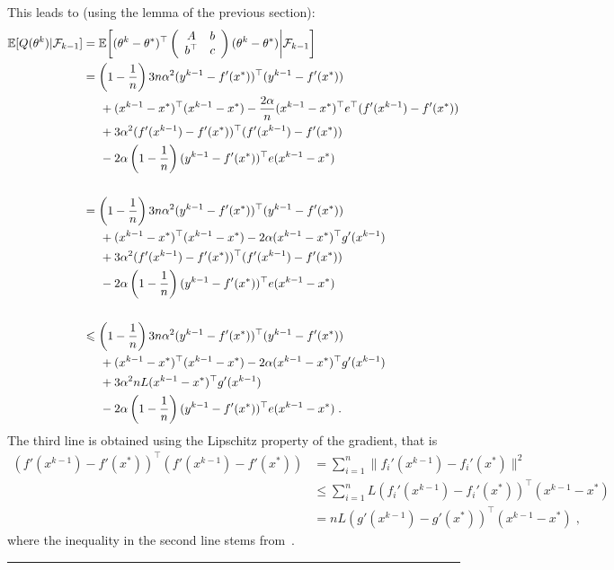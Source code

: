 \documentclass{article}
\newcommand{\BlackBox}{\rule{1.5ex}{1.5ex}}  %
\newenvironment{proof}{\par\noindent{\bf Proof\ }}{\hfill\BlackBox\\[2mm]}
\def\E{_{\scriptscriptstyle E}}
\def \E{{\mathbb E}}
\def \E{{\mathbb E}}
\begin{document}
\begin{proof}
This leads to (using the lemma of the previous section):
\begin{align*}
\E [ Q(\theta^k) | \mathcal{F}_{k-1} ] &=
\E \bigg[ (\theta^k - \theta^\ast)^\top
\left(
\begin{array}{cc} A & b \\ b^\top & c
\end{array}
\right)
(\theta^k - \theta^\ast) \bigg| \mathcal{F}_{k-1}\bigg]
\\
& =
\left(1-\frac{1}{n}\right) 3 n\alpha^2 (y^{k-1} - f'(x^\ast))^\top
(y^{k-1} - f'(x^\ast))
\\
&\hspace*{.5cm} + (x^{k-1} -x^\ast)^\top
(x^{k-1} -x^\ast) - \frac{2 \alpha}{n} (x^{k-1} -x^\ast)^\top e^\top ( f'(x^{k-1}) - f'(x^\ast)) \\
& \hspace*{.5cm}+ 3 \alpha^2 ( f'(x^{k-1}) - f'(x^\ast))^\top ( f'(x^{k-1}) - f'(x^\ast)) \\
&\hspace*{.5cm} - 2\alpha \left(1-\frac{1}{n}\right)(y^{k-1} - f'(x^\ast))^\top  e (x^{k-1} -x^\ast) \\
\\
& =
\left(1-\frac{1}{n}\right) 3 n\alpha^2 (y^{k-1} - f'(x^\ast))^\top
(y^{k-1} - f'(x^\ast))
\\
&\hspace*{.5cm} + (x^{k-1} -x^\ast)^\top
(x^{k-1} -x^\ast) - {2 \alpha} (x^{k-1} -x^\ast)^\top g'(x^{k-1}) \\
& \hspace*{.5cm}+ 3 \alpha^2 ( f'(x^{k-1}) - f'(x^\ast))^\top ( f'(x^{k-1}) - f'(x^\ast)) \\
&\hspace*{.5cm} - 2\alpha \left(1-\frac{1}{n}\right)(y^{k-1} - f'(x^\ast))^\top  e (x^{k-1} -x^\ast) \\
\\
&\leqslant
\left(1-\frac{1}{n}\right) 3 n\alpha^2 (y^{k-1} - f'(x^\ast))^\top
(y^{k-1} - f'(x^\ast))
\\
& \hspace*{.5cm}+ (x^{k-1} -x^\ast)^\top
(x^{k-1} -x^\ast) - {2 \alpha} (x^{k-1} -x^\ast)^\top g'(x^{k-1}) \\
&\hspace*{.5cm}+ 3 \alpha^2 n L (x^{k-1} -x^\ast)^\top g'(x^{k-1}) \\
&\hspace*{.5cm} - 2\alpha \left(1-\frac{1}{n}\right)(y^{k-1} - f'(x^\ast))^\top  e (x^{k-1} -x^\ast) \; .
\end{align*}
The third line is obtained using the Lipschitz property of the gradient, that is
\begin{align*}
( f'(x^{k-1}) - f'(x^\ast))^\top ( f'(x^{k-1}) - f'(x^\ast))
& = \sum_{i=1}^n \| f_i'(x^{k-1}) - f_i'(x^{\ast})\|^2 \\
&
\leqslant  \sum_{i=1}^n L ( f_i'(x^{k-1}) - f_i'(x^{\ast}))^\top( x^{k-1} - x^{\ast})
\\
& = nL ( g'(x^{k-1}) - g'(x^{\ast}))^\top( x^{k-1} - x^{\ast}) \; ,
\end{align*}
where the inequality in the second line stems from~\cite[Theorem 2.1.5]{nesterov2004introductory}.


\end{proof}
\end{document}
